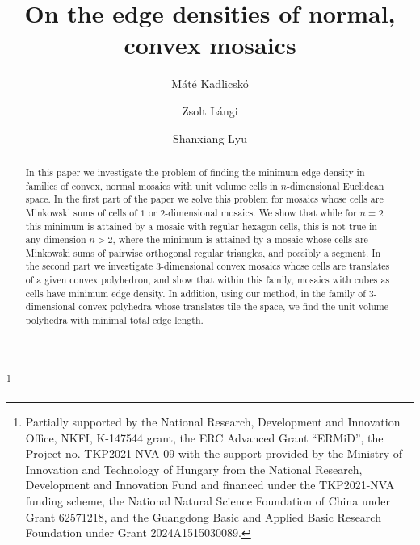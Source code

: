 \documentclass[twoside]{amsart}
\theoremstyle{definition}
\begin{document}
\title[On edge density]{On the edge densities of normal, convex mosaics}

\author[M. Kadlicsk\'o]{M\'at\'e Kadlicsk\'o}
\author[Z. L\'angi]{Zsolt L\'angi}
\author[S. Lyu]{Shanxiang Lyu}

\address{M\'at\'e Kadlicsk\'o, Independent researcher, Budapest, Hungary,\\
M\H uegyetem rkp. 3, H-1111 Budapest, Hungary}
\address{Zsolt L\'angi, Bolyai Institute, University of Szeged, Aradi v\'ertan\'uk tere 1, H-6720 Szeged, Hungary, and\\
Alfr\'ed R\'enyi Institute of Mathematics, Re\'altanoda utca 13-15, H-1053, Budapest, Hungary}
\address{Shanxiang Lyu, College of Cybersecurity, Jinan University, Guangzhou 510632, China}

\thanks{Partially supported by the National Research, Development and Innovation Office, NKFI, K-147544 grant, the ERC Advanced Grant “ERMiD”, the Project no. TKP2021-NVA-09 with the support provided by the Ministry of Innovation and Technology of Hungary from the National Research, Development and Innovation Fund and financed under the TKP2021-NVA funding scheme, the National Natural Science Foundation of China under Grant 62571218, and the Guangdong Basic and Applied Basic Research Foundation under Grant 2024A1515030089.}


\begin{abstract}
In this paper we investigate the problem of finding the minimum edge density in families of convex, normal mosaics with unit volume cells in $n$-dimensional Euclidean space. In the first part of the paper we solve this problem for mosaics whose cells are Minkowski sums of cells of $1$ or $2$-dimensional mosaics. We show that while for $n=2$ this minimum is attained by a mosaic with regular hexagon cells, this is not true in any dimension $n > 2$, where the minimum is attained by a mosaic whose cells are Minkowski sums of pairwise orthogonal regular triangles, and possibly a segment. In the second part we investigate $3$-dimensional convex mosaics whose cells are translates of a given convex polyhedron, and show that within this family, mosaics with cubes as cells have minimum edge density. In addition, using our method, in the family of $3$-dimensional convex polyhedra whose translates tile the space,  we find the unit volume polyhedra with minimal total edge length.
\end{abstract}
\end{document}
